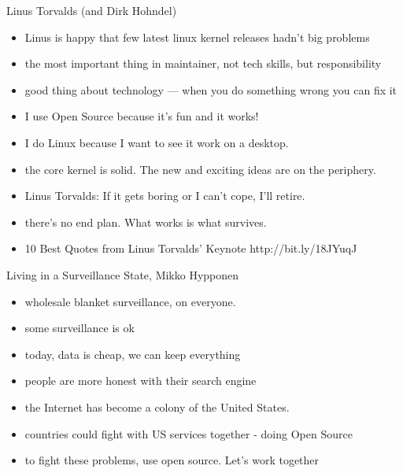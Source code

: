 \documentclass[aspectratio=169]{beamer}
\begin{document}
\begin{frame}{Linus Torvalds (and Dirk Hohndel)}
  \begin{itemize}
  \item Linus is happy that few latest linux kernel releases hadn't big problems
  \item the most important thing in maintainer, not tech skills, but responsibility
  \item good thing about technology --- when you do something wrong you can fix it 
  \item I use Open Source because it's fun and it works!
  \item I do Linux because I want to see it work on a desktop.
  \item the core kernel is solid. The new and exciting ideas are on the periphery.
  \item Linus Torvalds: If it gets boring or I can't cope, I'll retire.
  \item there's no end plan. What works is what survives.
  \item 10 Best Quotes from Linus Torvalds' Keynote http://bit.ly/18JYuqJ 
  \end{itemize}
\end{frame}

\begin{frame}{Living in a Surveillance State, Mikko Hypponen}
  \begin{itemize}
  \item wholesale blanket surveillance, on everyone.
  \item some surveillance is ok
  \item today, data is cheap, we can keep everything
  \item people are more honest with their search engine
  \item the Internet has become a colony of the United States.
  \item countries could fight with US services together - doing Open Source
  \item to fight these problems, use open source. Let's work together
  \end{itemize}
\end{frame}
\end{document}
